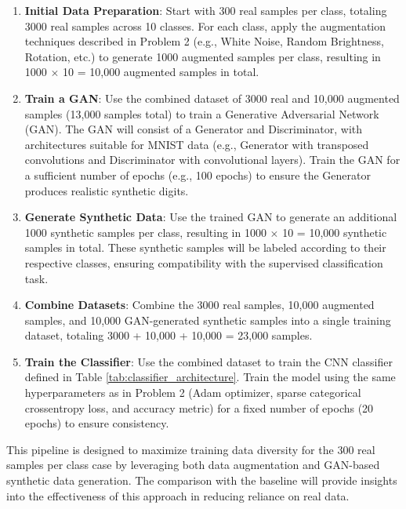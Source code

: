 \documentclass[12pt]{article}
\begin{document}
\begin{enumerate}
    \item \textbf{Initial Data Preparation}: Start with 300 real samples per class, totaling 3000 real samples across 10 classes. For each class, apply the augmentation techniques described in Problem 2 (e.g., White Noise, Random Brightness, Rotation, etc.) to generate 1000 augmented samples per class, resulting in 1000 $\times$ 10 = 10,000 augmented samples in total.
    
    \item \textbf{Train a GAN}: Use the combined dataset of 3000 real and 10,000 augmented samples (13,000 samples total) to train a Generative Adversarial Network (GAN). The GAN will consist of a Generator and Discriminator, with architectures suitable for MNIST data (e.g., Generator with transposed convolutions and Discriminator with convolutional layers). Train the GAN for a sufficient number of epochs (e.g., 100 epochs) to ensure the Generator produces realistic synthetic digits.
    
    \item \textbf{Generate Synthetic Data}: Use the trained GAN to generate an additional 1000 synthetic samples per class, resulting in 1000 $\times$ 10 = 10,000 synthetic samples in total. These synthetic samples will be labeled according to their respective classes, ensuring compatibility with the supervised classification task.
    
    \item \textbf{Combine Datasets}: Combine the 3000 real samples, 10,000 augmented samples, and 10,000 GAN-generated synthetic samples into a single training dataset, totaling 3000 + 10,000 + 10,000 = 23,000 samples.
    
    \item \textbf{Train the Classifier}: Use the combined dataset to train the CNN classifier defined in Table \ref{tab:classifier_architecture}. Train the model using the same hyperparameters as in Problem 2 (Adam optimizer, sparse categorical crossentropy loss, and accuracy metric) for a fixed number of epochs (20 epochs) to ensure consistency.
    
\end{enumerate}

This pipeline is designed to maximize training data diversity for the 300 real samples per class case by leveraging both data augmentation and GAN-based synthetic data generation. The comparison with the baseline will provide insights into the effectiveness of this approach in reducing reliance on real data.
\end{document}
